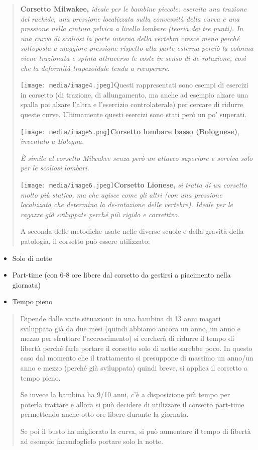 \documentclass[]{article}
\begin{document}
\begin{quote}
\textbf{Corsetto Milwakee,} \emph{ideale per le bambine piccole:
esercita una trazione del rachide, una pressione localizzata sulla
convessità della curva e una pressione nella cintura pelvica a livello
lombare (teoria dei tre punti). In una curva di scoliosi la parte
interna della vertebra cresce meno perché sottoposta a maggiore
pressione rispetto alla parte esterna perciò la colonna viene trazionata
e spinta attraverso le coste in senso di de-rotazione, così che la
deformità trapezoidale tenda a recuperare}.

\texttt{[image: media/image4.jpeg]}Questi
rappresentati sono esempi di esercizi in corsetto (di trazione, di
allungamento, ma anche ad esempio alzare una spalla poi alzare l'altra e
l'esercizio controlaterale) per cercare di ridurre queste curve.
Ultimamente questi esercizi sono stati però un po' superati.

\texttt{[image: media/image5.png]}\textbf{Corsetto
lombare basso (Bolognese)}, \emph{inventato a Bologna.}

\emph{È simile al corsetto Milwakee senza però un attacco superiore e
serviva solo per le scoliosi lombari.}

\texttt{[image: media/image6.jpeg]}\textbf{Corsetto
Lionese,} \emph{si tratta di un corsetto molto più statico, ma che
agisce come gli altri (con una pressione localizzata che determina la
de-rotazione delle vertebre). Ideale per le ragazze già sviluppate
perché più rigido e correttivo.}

A seconda delle metodiche usate nelle diverse scuole e della gravità
della patologia, il corsetto può essere utilizzato:
\end{quote}

\begin{itemize}
\item
  Solo di notte
\item
  Part-time (con 6-8 ore libere dal corsetto da gestirsi a piacimento
  nella giornata)
\item
  Tempo pieno
\end{itemize}

\begin{quote}
Dipende dalle varie situazioni: in una bambina di 13 anni magari
sviluppata già da due mesi (quindi abbiamo ancora un anno, un anno e
mezzo per sfruttare l'accrescimento) si cercherà di ridurre il tempo di
libertà perché farle portare il corsetto solo di notte sarebbe poco. In
questo caso dal momento che il trattamento si presuppone di massimo un
anno/un anno e mezzo (perché già sviluppata) quindi breve, si applica il
corsetto a tempo pieno.

Se invece la bambina ha 9/10 anni, c'è a disposizione più tempo per
poterla trattare e allora si può decidere di utilizzare il corsetto
part-time permettendo anche otto ore libere durante la giornata.

Se poi il busto ha migliorato la curva, si può aumentare il tempo di
libertà ad esempio facendoglielo portare solo la notte.
\end{quote}
\end{document}

